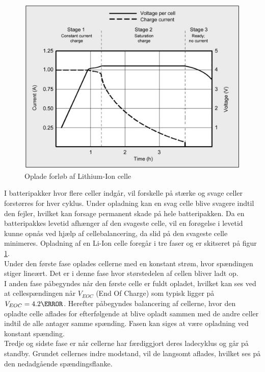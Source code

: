 \begin{figure}[h]
	\centering
	\includegraphics[width=14cm]{billeder/liion_opladning.png}
	\caption{Oplade forløb af Lithium-Ion celle}
	\label{fig:opladning_liion}
\end{figure}
\FloatBlock

I batteripakker hvor flere celler indgår, vil forskelle på stærke og svage celler forstørres for hver cyklus. Under opladning kan en svag celle blive svagere indtil den fejler, hvilket kan forsage permanent skade på hele batteripakken. Da en batteripakkes levetid afhænger af den svageste celle, vil en forøgelse i levetid kunne opnås ved hjælp af cellebalancering, da slid på den svageste celle minimeres. Opladning af en Li-Ion celle foregår i tre faser og er skitseret på figur \ref{fig:opladning_liion}.
\\

Under den første fase oplades cellerne med en konstant strøm, hvor spændingen stiger lineært. Det er i denne fase hvor størstedelen af cellen bliver ladt op.
\\

I anden fase påbegyndes når den første celle er fuldt opladet, hvilket kan ses ved at cellespændingen når $V_{EOC}$ (End Of Charge) som typisk ligger på $V_{EOC} = 4.2 \volt$. Herefter påbegyndes balancering af cellerne, hvor den opladte celle aflades for efterfølgende at blive opladt sammen med de andre celler indtil de alle antager samme spænding.
Fasen kan siges at være opladning ved konstant spænding.
\\

Tredje og sidste fase er når cellerne har færdiggjort deres ladecyklus og går på standby. Grundet cellernes indre modstand, vil de langsomt aflades, hvilket ses på den nedadgående spændingsflanke.

